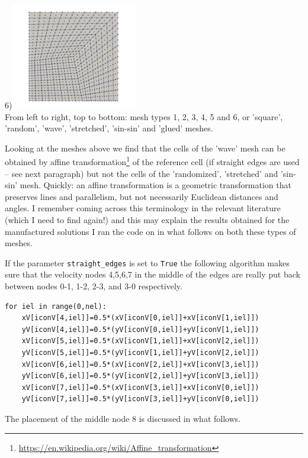\begin{center}
6)\includegraphics[width=5.5cm]{python_codes/fieldstone_76/results/mesh_type6}\\
{\captionfont From left to right, top to bottom: mesh types 1, 2, 3, 4, 5 and 6, 
or 'square', 'random', 'wave', 'stretched', 'sin-sin' and 'glued' meshes.}
\end{center}

Looking at the meshes above we find that the cells of the 'wave' mesh 
can be obtained by affine transformation\footnote{\url{https://en.wikipedia.org/wiki/Affine_transformation}} 
of the reference cell (if straight edges are used -- see next paragraph) 
but not the cells of the 'randomized', 'stretched' and 'sin-sin' mesh. 
Quickly: an affine transformation 
is a geometric transformation that preserves lines and parallelism, but not necessarily 
Euclidean distances and angles. 
I remember coming across this terminology in the relevant literature (which I need to find again!)
and this may explain the results obtained for the manufactured solutions I ran the code on 
in what follows on both these types of meshes.

If the parameter \lstinline{straight_edges} is set to \lstinline{True}
the following algorithm makes sure that the velocity nodes 4,5,6,7 in the middle of the edges 
are really put back between nodes 0-1, 1-2, 2-3, and 3-0 respectively. 
\begin{lstlisting}
for iel in range(0,nel):
    xV[iconV[4,iel]]=0.5*(xV[iconV[0,iel]]+xV[iconV[1,iel]])
    yV[iconV[4,iel]]=0.5*(yV[iconV[0,iel]]+yV[iconV[1,iel]])
    xV[iconV[5,iel]]=0.5*(xV[iconV[1,iel]]+xV[iconV[2,iel]])
    yV[iconV[5,iel]]=0.5*(yV[iconV[1,iel]]+yV[iconV[2,iel]])
    xV[iconV[6,iel]]=0.5*(xV[iconV[2,iel]]+xV[iconV[3,iel]])
    yV[iconV[6,iel]]=0.5*(yV[iconV[2,iel]]+yV[iconV[3,iel]])
    xV[iconV[7,iel]]=0.5*(xV[iconV[3,iel]]+xV[iconV[0,iel]])
    yV[iconV[7,iel]]=0.5*(yV[iconV[3,iel]]+yV[iconV[0,iel]])
\end{lstlisting}
The placement of the middle node 8 is discussed in what follows.


